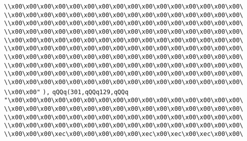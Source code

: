 \verb|\\x00\x00\x00\x00\x00\x00\x00\x00\x00\x00\x00\x00\x00\x00\x00\x00\|\newline
\verb|\\x00\x00\x00\x00\x00\x00\x00\x00\x00\x00\x00\x00\x00\x00\x00\x00\|\newline
\verb|\\x00\x00\x00\x00\x00\x00\x00\x00\x00\x00\x00\x00\x00\x00\x00\x00\|\newline
\verb|\\x00\x00\x00\x00\x00\x00\x00\x00\x00\x00\x00\x00\x00\x00\x00\x00\|\newline
\verb|\\x00\x00\x00\x00\x00\x00\x00\x00\x00\x00\x00\x00\x00\x00\x00\x00\|\newline
\verb|\\x00\x00\x00\x00\x00\x00\x00\x00\x00\x00\x00\x00\x00\x00\x00\x00\|\newline
\verb|\\x00\x00\x00\x00\x00\x00\x00\x00\x00\x00\x00\x00\x00\x00\x00\x00\|\newline
\verb|\\x00\x00\x00\x00\x00\x00\x00\x00\x00\x00\x00\x00\x00\x00\x00\x00\|\newline
\verb|\\x00\x00\x00\x00\x00\x00\x00\x00\x00\x00\x00\x00\x00\x00\x00\x00\|\newline
\verb|\\x00\x00\x00\x00\x00\x00\x00\x00\x00\x00\x00\x00\x00\x00\x00\x00\|\newline
\verb|\\x00\x00"|\newline
\verb|),|\newline
\verb|qQQq(301,qQQq129,qQQq|\newline
\verb|"\x00\x00\x00\x00\x00\x00\x00\x00\x00\x00\x00\x00\x00\x00\x00\x00\|\newline
\verb|\\x00\x00\x00\x00\x00\x00\x00\x00\x00\x00\x00\x00\x00\x00\x00\x00\|\newline
\verb|\\x00\x00\x00\x00\x00\x00\x00\x00\x00\x00\x00\x00\x00\x00\x00\x00\|\newline
\verb|\\x00\x00\x00\x00\x00\x00\x00\x00\x00\x00\x00\x00\x00\x00\x00\x00\|\newline
\verb|\\x00\x00\x00\xec\x00\x00\x00\x00\x00\xec\x00\xec\x00\xec\x00\x00\|\newline
